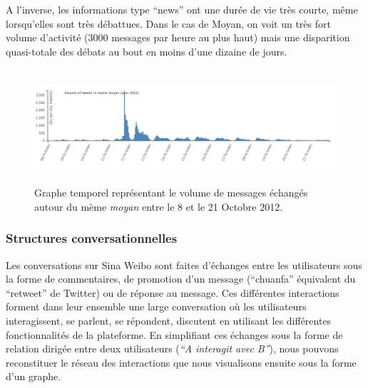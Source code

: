 A l{\textquoteright}inverse, les informations type {\textquotedblleft}news{\textquotedblright} ont une dur\'ee de vie tr\`es courte, m\^eme lorsqu{\textquoteright}elles sont tr\`es d\'ebattues. Dans le cas de Moyan, on voit un tr\`es fort volume d{\textquoteright}activit\'e (3000 messages par heure au plus haut) mais une disparition quasi-totale des d\'ebats au bout en moins d{\textquoteright}une dizaine de jours.

\begin{figure}
    \centering
    \includegraphics[width=6.0087in,height=1.6697in]{figures/chap4/chapitre4-img6.png}
    \caption{
      Graphe temporel repr\'esentant le volume de messages \'echang\'es autour du m\`eme \textit{moyan} entre le 8 et le 21 Octobre 2012.
    }
\end{figure}

\subsubsection[Structures conversationnelles]{Structures
conversationnelles}
Les conversations sur Sina Weibo sont faites
d{\textquoteright}\'echanges entre les utilisateurs sous la forme de
commentaires, de promotion d{\textquoteright}un message
({\textquotedblleft}chuanfa{\textquotedblright} \'equivalent du
{\textquotedblleft}retweet{\textquotedblright} de Twitter) ou de
r\'eponse au message. Ces diff\'erentes interactions forment dans leur
ensemble une large conversation o\`u les utilisateurs interagissent, se
parlent, se r\'epondent, discutent en utilisant les diff\'erentes
fonctionnalit\'es de la plateforme. En simplifiant ces \'echanges sous
la forme de relation dirig\'ee entre deux utilisateurs
(\textit{{\textquotedblleft}A interagit avec B{\textquotedblright}}),
nous pouvons reconstituer le r\'eseau des interactions que nous
visualisons ensuite sous la forme d{\textquoteright}un graphe. 


